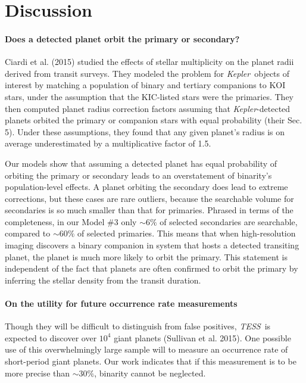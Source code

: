 \section{Discussion}
\label{sec:discussion}

\paragraph{Does a detected planet orbit the primary or secondary?}
Ciardi et al. (2015) studied the effects of stellar multiplicity on the 
planet radii derived from transit surveys.
They modeled the problem for {\it Kepler}\ objects of interest by matching a 
population of binary and tertiary companions to KOI stars, 
under the assumption that the KIC-listed stars were the primaries.
They then computed planet radius correction factors assuming that {\it 
Kepler}-detected planets orbited the primary or companion stars
with equal probability (their Sec. 5).
Under these assumptions, they found that any given planet's radius is on 
average underestimated by a multiplicative factor of 1.5.

Our models show that assuming a detected planet has equal probability of 
orbiting the primary or secondary leads to an overstatement of
binarity's population-level effects.
A planet orbiting the secondary does lead to extreme corrections, but these 
cases are rare outliers, because the searchable volume for secondaries is so 
much smaller than that for primaries.
Phrased in terms of the completeness, in our Model \#3 only $\sim 6\%$ of 
selected secondaries are searchable, compared to $\sim 60\%$ of selected 
primaries.
This means that when high-resolution imaging discovers a binary companion in 
system that hosts a detected transiting planet, the planet is much
more likely to orbit the primary.
This statement is independent of the fact that planets are often confirmed to 
orbit the primary by inferring the stellar density from the transit duration.


\paragraph{On the utility for future occurrence rate measurements}
Though they will be difficult to distinguish from false positives, {\it TESS}\ 
is expected to discover over $10^4$ giant planets (Sullivan et al. 2015).
One possible use of this overwhelmingly large sample will to measure an
occurrence rate of short-period giant planets.
Our work indicates that if this measurement is to be more precise than $\sim 
30\%$, binarity cannot be neglected.



